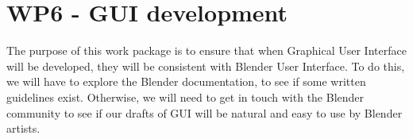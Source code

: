 \section{WP6 - GUI development}

The purpose of this work package is to ensure that when Graphical User Interface will be developed, they will be consistent with Blender User Interface. To do this, we will have to explore the Blender documentation, to see if some written guidelines exist. Otherwise, we will need to get in touch with the Blender community to see if our drafts of GUI will be natural and easy to use by Blender artists.
